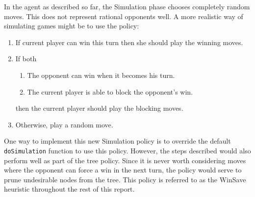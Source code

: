 In the agent as described so far, the Simulation phase chooses completely random moves. This does not represent rational opponents well. A more realistic way of simulating games might be to use the policy:
\begin{enumerate}
\item If current player can win this turn then she should play the winning moves.
\item If both 
\begin{enumerate}
\item The opponent can win when it becomes his turn.\par
\item The current player is able to block the opponent's win.\par
\end{enumerate}
then the current player should play the blocking moves.
\item Otherwise, play a random move.
\end{enumerate}

One way to implement this new Simulation policy is to override the default \texttt{doSimulation} function to use this policy. However, the steps described would also perform well as part of the tree policy. Since it is never worth considering moves where the opponent can force a win in the next turn, the policy would serve to prune undesirable nodes from the tree. This policy is referred to as the {WinSave} heuristic throughout the rest of this report.


